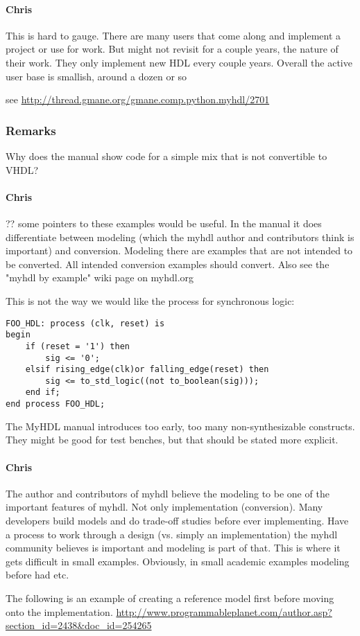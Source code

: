 \documentclass[a4paper, conference]{IEEEtran}
\newcommand{\comment}[3]{\paragraph*{\textbf{#1}}{\color{#3}#2}}
\newcommand{\cfelton}[1]{\comment{Chris}{#1}{Blue}}
\begin{document}
\cfelton{This is hard to gauge.  There are many users that come along and implement
a project or use for work.  But might not revisit for a couple years, the nature of 
their work.  They only implement new HDL every couple years.  Overall the active
user base is smallish, around a dozen or so}

see \url{http://thread.gmane.org/gmane.comp.python.myhdl/2701}

\subsubsection{Remarks}

Why does the manual show code for a simple mix that is not convertible to VHDL?

\cfelton{?? some pointers to these examples would be useful.  In the manual it
does differentiate between modeling (which the myhdl author and contributors think
is important) and conversion.  Modeling there are examples that are not intended
to be converted.  All intended conversion examples should convert.  Also see the 
"myhdl by example" wiki page on myhdl.org}

This is not the way we would like the process for synchronous logic:

\begin{verbatim}
FOO_HDL: process (clk, reset) is
begin
    if (reset = '1') then
        sig <= '0';
    elsif rising_edge(clk)or falling_edge(reset) then
        sig <= to_std_logic((not to_boolean(sig)));
    end if;
end process FOO_HDL;
\end{verbatim}

The MyHDL manual introduces too early, too many non-synthesizable constructs.
They might be good for test benches, but that should be stated more explicit.

\cfelton{The author and contributors of myhdl believe the modeling to be one
of the important features of myhdl.  Not only implementation (conversion).  Many
developers build models and do trade-off studies before ever implementing.  
Have a process to work through a design (vs. simply an implementation) the 
myhdl community believes is important and modeling is part of that.  This is
where it gets difficult in small examples.  Obviously, in small academic examples
modeling before had etc. 

The following is an example of creating a reference model first before moving
onto the implementation.
\url{http://www.programmableplanet.com/author.asp?section_id=2438&doc_id=254265}
}
\end{document}
